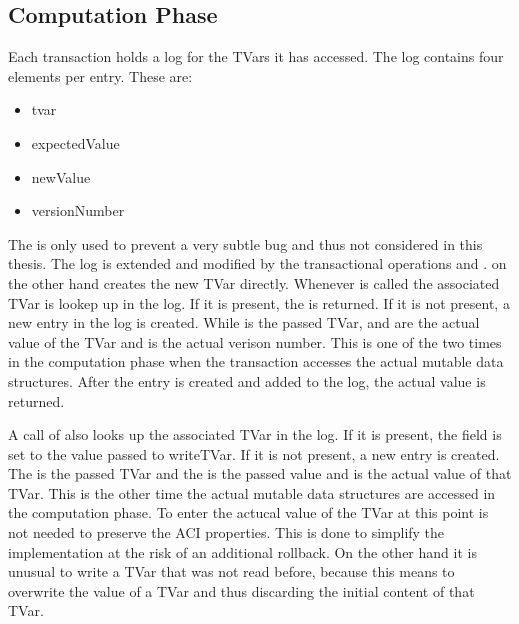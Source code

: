 \subsection{Computation Phase}
Each transaction holds a log for the TVars it has accessed. The log contains four elements per entry. These are: 
\begin{itemize}
 \item tvar
 \item expectedValue
 \item newValue
 \item versionNumber
\end{itemize}
The  is only used to prevent a very subtle bug and thus not considered in this thesis. 
The log is extended and modified by the transactional operations  and .  on 
the other hand creates the new TVar directly. Whenever  is called the associated TVar is lookep up in the log.
If it is present, the  is returned. If it is not present, a new entry in the log is created. While 
is the passed TVar,  and  are the actual value of the TVar and  is 
the actual verison number.
This is one of the two times in the computation phase when the transaction accesses the actual mutable data structures.  
After the entry is created and added to the log, the actual value is returned. 

A call of  also looks up the associated TVar in the log. If it is present, the field  is 
set to the value passed to writeTVar. If it is not present, a new entry is created. The  is the passed TVar and
the  is the passed value and  is the actual value of that TVar. This is the other time 
the actual mutable data structures are accessed in the computation phase. To enter the actucal value of the TVar at this
point is not needed to preserve the ACI properties. This is done to simplify the implementation at the risk of an additional
rollback. On the other hand it is unusual to write a TVar that was not read before, because this means to overwrite the 
value of a TVar and thus discarding the initial content of that TVar.

